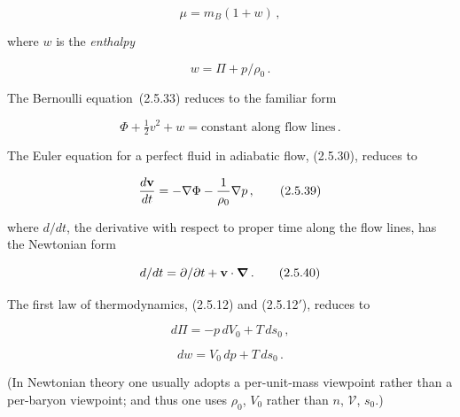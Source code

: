 \begin{equation}
\mu = m_B(1 + w)\,,
\tag{2.5.36}
\end{equation}


where $w$ is the \textit{enthalpy}

\begin{equation}
w = \Pi + p/\rho_0\,.
\tag{2.5.37}
\end{equation}

The Bernoulli equation~(2.5.33) reduces to the familiar form

\begin{equation}
\Phi + \tfrac{1}{2}v^2 + w = \text{constant along flow lines}\,.
\tag{2.5.38}
\end{equation}

The Euler equation for a perfect fluid in adiabatic flow, (2.5.30), reduces to

\begin{equation}
\frac{d\mathbf{v}}{dt} = -\nabla\Phi - \frac{1}{\rho_0}\nabla p\,,
\tag{2.5.39}
\end{equation}

where $d/dt$, the derivative with respect to proper time along the flow lines, has
the Newtonian form

\begin{equation}
d/dt = \partial/\partial t + \mathbf{v}\cdot\boldsymbol{\nabla}\,.
\tag{2.5.40}
\end{equation}

The first law of thermodynamics, (2.5.12) and (2.5.12$'$), reduces to

\begin{equation}
d\Pi = -p\,dV_0 + T\,ds_0\,,
\tag{2.5.41}
\end{equation}

\begin{equation}
dw = V_0\,dp + T\,ds_0\,.
\tag{2.5.42}
\end{equation}

(In Newtonian theory one usually adopts a per-unit-mass viewpoint rather than a
per-baryon viewpoint; and thus one uses $\rho_0$, $V_0$ rather than $n$, $\mathcal{V}$, $s_0$.)


